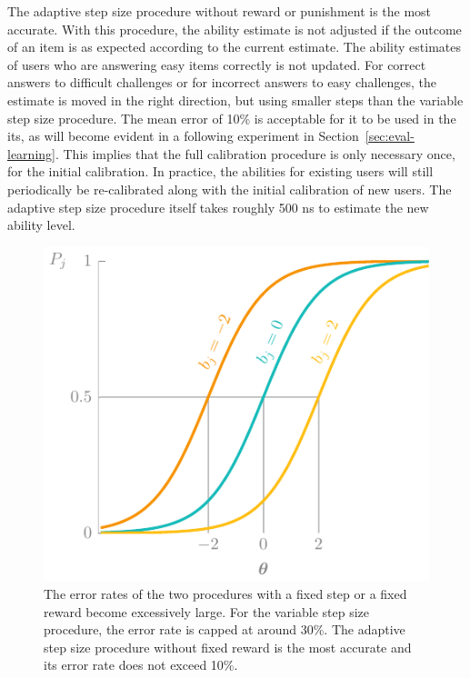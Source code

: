 The adaptive step size procedure without reward or punishment is the most accurate.
With this procedure, the ability estimate is not adjusted if the outcome of an item is as expected according to the current estimate.
The ability estimates of users who are answering easy items correctly is not updated.
For correct answers to difficult challenges or for incorrect answers to easy challenges, the estimate is moved in the right direction, but using smaller steps than the variable step size procedure.
The mean error of 10\% is acceptable for it to be used in the \gls{its}, as will become evident in a following experiment in Section~\ref{sec:eval-learning}.
This implies that the full calibration procedure is only necessary once, for the initial calibration.
In practice, the abilities for existing users will still periodically be re-calibrated along with the initial calibration of new users.
The adaptive step size procedure itself takes roughly 500 ns to estimate the new ability level.

\begin{figure}
    \centering
    \includegraphics[page=13]{03-education/figures/tikzfigures.pdf}
    \caption[Error rates of step size adjustment procedures]{The error rates of the two procedures with a fixed step or a fixed reward become excessively large. For the variable step size procedure, the error rate is capped at around 30\%. The adaptive step size procedure without fixed reward is the most accurate and its error rate does not exceed 10\%.}
    \label{fig:stepsize}
\end{figure}
